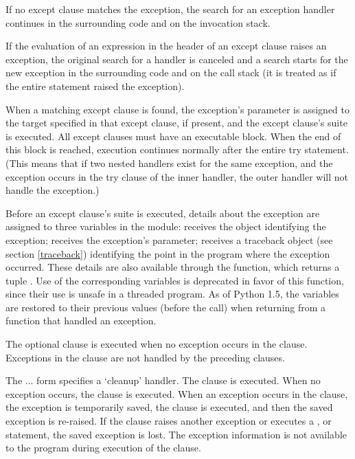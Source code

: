 If no except clause matches the exception, the search for an exception
handler continues in the surrounding code and on the invocation stack.

If the evaluation of an expression in the header of an except clause
raises an exception, the original search for a handler is canceled
and a search starts for the new exception in the surrounding code and
on the call stack (it is treated as if the entire  statement
raised the exception).

When a matching except clause is found, the exception's parameter is
assigned to the target specified in that except clause, if present,
and the except clause's suite is executed.  All except clauses must
have an executable block.  When the end of this block
is reached, execution continues normally after the entire try
statement.  (This means that if two nested handlers exist for the same
exception, and the exception occurs in the try clause of the inner
handler, the outer handler will not handle the exception.)

Before an except clause's suite is executed, details about the
exception are assigned to three variables in the
 module:  receives
the object identifying the exception;  receives
the exception's parameter;  receives a
traceback object (see section \ref{traceback})
identifying the point in the program where the exception occurred.
These details are also available through the 
function, which returns a tuple .  Use of the corresponding variables is
deprecated in favor of this function, since their use is unsafe in a
threaded program.  As of Python 1.5, the variables are restored to
their previous values (before the call) when returning from a function
that handled an exception.

The optional  clause is executed when no exception occurs
in the  clause.  Exceptions in the  clause are
not handled by the preceding  clauses.

The ... form specifies a `cleanup' handler.  The
 clause is executed.  When no exception occurs, the
 clause is executed.  When an exception occurs in the
 clause, the exception is temporarily saved, the
 clause is executed, and then the saved exception is
re-raised.  If the  clause raises another exception or
executes a ,  or  statement,
the saved exception is lost.  The exception information is not
available to the program during execution of the 
clause.

